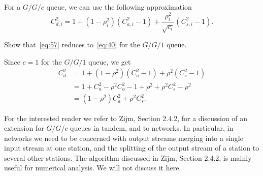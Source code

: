 For a $G/G/c$ queue, we can use the following approximation
\begin{equation}\label{eq:57}
  C_{d,i}^2 = 1 + (1-\rho_i^2)(C_{a,i}^2-1) + \frac{\rho_i^2}{\sqrt{c_i}}(C_{s,i}^2-1).
\end{equation}

\begin{exercise}
  Show that~\cref{eq:57} reduces to~\cref{eq:40} for the $G/G/1$ queue.
\begin{solution}
    Since $c=1$ for the $G/G/1$ queue, we get
\begin{align*}
  C_{d}^2 
&= 1 + (1-\rho^2)(C_{a}^2-1) + \rho^2(C_{s}^2-1) \\
&= 1 + C_a^2 - \rho^2 C_{a}^2 -1 + \rho^2  + \rho^2 C_{s}^2 -\rho^2 \\
&= (1-\rho^2) C_a^2  + \rho^2 C_{s}^2.
\end{align*}
\end{solution}
\end{exercise}


For the interested reader we refer to Zijm, Section 2.4.2, for a discussion of an extension for $G/G/c$ queues in tandem, and to networks. In particular, in networks we need to be concerned with output streams merging into a single input stream at one station, and the splitting of the output stream of a station to several other stations. The algorithm discussed in Zijm, Section 2.4.2, is mainly useful for numerical analysis. We will not discuss it here. 







